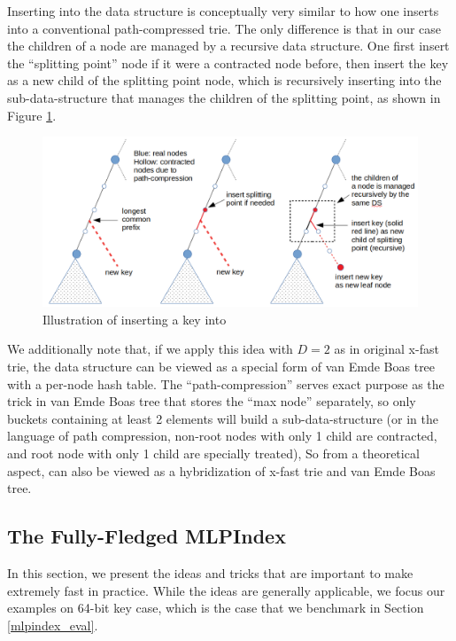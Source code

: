 \documentclass[11pt, usletter]{article}
\begin{document}
Inserting into the data structure is conceptually very similar to how one inserts into a conventional 
path-compressed trie.
The only difference is that in our case the children of a node are managed by a recursive data structure. 
One first insert the ``splitting point'' node if it were a contracted node before,  
then insert the key as a new child of the splitting point node, 
which is recursively inserting into the sub-data-structure that manages the children of the splitting point, 
as shown in Figure \ref{mlpindex_insert}.

\begin{figure}[!htb]
  \includegraphics[width=\linewidth]{mlpindex_insert.png}
\caption{Illustration of inserting a key into \MlpIndex}
\label{mlpindex_insert}
\end{figure}

We additionally note that, if we apply this idea with $D=2$ as in original x-fast trie, 
the data structure can be viewed as a special form of van Emde Boas tree \cite{vebtree} with a per-node hash table.
The ``path-compression'' serves exact purpose as the trick in van Emde Boas tree that stores the ``max node'' separately, 
so only buckets containing at least 2 elements will build a sub-data-structure 
(or in the language of path compression, non-root nodes with only 1 child are contracted, 
and root node with only 1 child are specially treated), 
So from a theoretical aspect, \MlpIndex can also be viewed as a hybridization of x-fast trie and van Emde Boas tree.

\subsection{The Fully-Fledged MLPIndex} \label{mlpindex}

In this section, we present the ideas and tricks that are important to make \MlpIndex 
extremely fast in practice. While the ideas are generally applicable, 
we focus our examples on 64-bit key case, which is the case that we benchmark in Section \ref{mlpindex_eval}.
\end{document}
